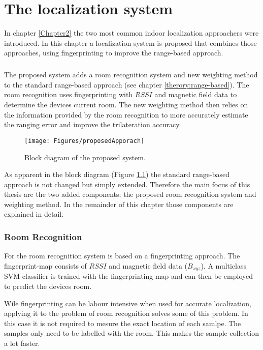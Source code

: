\chapter{The localization system}

\label{Chapter3}

In chapter \ref{Chapter2} the two most common indoor localization approachers were introduced. In this chapter a localization system is proposed that combines those approaches, using fingerprinting to improve the range-based approach.

\paragraph{}The proposed system adds a room recognition system and new weighting method to the standard range-based approach (see chapter \ref{therory:range-based}). The room recognition uses fingerprinting with $RSSI$ and magnetic field data to determine the devices current room. The new weighting method then relies on the information provided by the room recognition to more accurately estimate the ranging error and improve the trilateration accuracy.

\begin{figure}[ht]
\centering
\texttt{[image: Figures/proposedApporach]}
\decoRule
\caption[The proposed approach]{Block diagram of the proposed system.}
\label{fig:proposedApproach}
\end{figure}

As apparent in the block diagram (Figure \ref{fig:proposedApproach}) the standard range-based approach is not changed but simply extended. Therefore the main focus of this thesis are the two added components; the proposed room recognition system and weighting method. In the remainder of this chapter those components are explained in detail. 

\subsection{Room Recognition}
For the room recognition system is based on a fingerprinting approach. The fingerprint-map consists of $RSSI$ and magnetic field data ($B_{xyz}$). A multiclass SVM classifier is trained with the fingerprinting map and can then be employed to predict the devices room.

Wile fingerprinting can be labour intensive when used for accurate localization, applying it to the problem of room recognition solves some of this problem. In this case it is not required to mesure the exact location of each samlpe. The samples only need to be labelled with the room. This makes the sample collection a lot faster.

